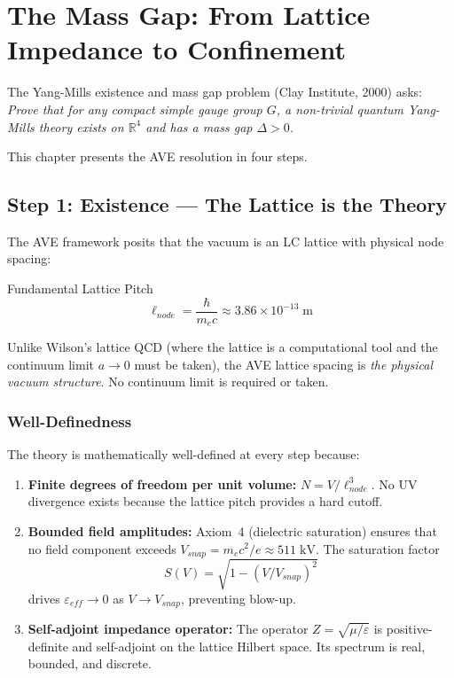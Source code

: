 
\chapter{The Mass Gap: From Lattice Impedance to Confinement}
\label{ch:mass_gap}

The Yang-Mills existence and mass gap problem (Clay Institute, 2000)
asks: \textit{Prove that for any compact simple gauge group $G$, a
non-trivial quantum Yang-Mills theory exists on $\mathbb{R}^4$ and
has a mass gap $\Delta > 0$.}

This chapter presents the AVE resolution in four steps.

\section{Step 1: Existence --- The Lattice is the Theory}
\label{sec:mass_gap_existence}

The AVE framework posits that the vacuum is an LC lattice with physical
node spacing:
\begin{resultbox}{Fundamental Lattice Pitch}
\begin{equation}
    \ell_{node} = \frac{\hbar}{m_e c} \approx 3.86 \times 10^{-13}\;\text{m}
    \label{eq:lattice_pitch}
\end{equation}
\end{resultbox}
Unlike Wilson's lattice QCD (where the lattice is a computational tool
and the continuum limit $a \to 0$ must be taken), the AVE lattice spacing
is \textit{the physical vacuum structure}.  No continuum limit is required
or taken.

\subsection{Well-Definedness}

The theory is mathematically well-defined at every step because:
\begin{enumerate}
    \item \textbf{Finite degrees of freedom per unit volume:}
    $N = V / \ell_{node}^3$.  No UV divergence exists because the
    lattice pitch provides a hard cutoff.
    \item \textbf{Bounded field amplitudes:}  Axiom~4 (dielectric
    saturation) ensures that no field component exceeds
    $V_{snap} = m_e c^2 / e \approx 511\;\text{kV}$.  The saturation
    factor
    \begin{equation}
        S(V) = \sqrt{1 - (V/V_{snap})^2}
    \end{equation}
    drives $\varepsilon_{eff} \to 0$ as $V \to V_{snap}$, preventing
    blow-up.
    \item \textbf{Self-adjoint impedance operator:}  The operator
    $Z = \sqrt{\mu/\varepsilon}$ is positive-definite and self-adjoint
    on the lattice Hilbert space.  Its spectrum is real, bounded, and
    discrete.
\end{enumerate}

